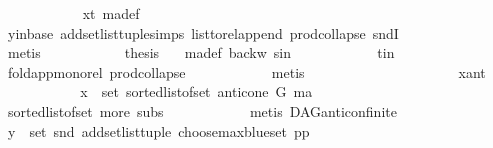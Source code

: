 \begin{isabellebody}
\ \ \ \ \ \ \ \ \ \ \isamarkupfalse%
\ x{\isacharunderscore}{\kern0pt}t\ ma{\isacharunderscore}{\kern0pt}def\ \isanewline
\ \ \ \ \ \ \ \ \ \ \isamarkupfalse%
\ y{\isacharunderscore}{\kern0pt}in{\isacharunderscore}{\kern0pt}base\ add{\isacharunderscore}{\kern0pt}set{\isacharunderscore}{\kern0pt}list{\isacharunderscore}{\kern0pt}tuple{\isachardot}{\kern0pt}simps\ list{\isacharunderscore}{\kern0pt}to{\isacharunderscore}{\kern0pt}rel{\isacharunderscore}{\kern0pt}append\ prod{\isachardot}{\kern0pt}collapse\ sndI\isanewline
\ \ \ \ \ \ \ \ \ \ \isamarkupfalse%
\ metis\isanewline
\ \ \ \ \ \ \ \ \isamarkupfalse%
\ \isamarkupfalse%
\ {\isacharquery}{\kern0pt}thesis\ \isamarkupfalse%
\ \ ma{\isacharunderscore}{\kern0pt}def\ backw\ s{\isacharunderscore}{\kern0pt}in\isanewline
\ \ \ \ \ \ \ \ \ \ \isamarkupfalse%
\ t{\isacharunderscore}{\kern0pt}in\ \isanewline
\ \ \ \ \ \ \ \ \ \ \isamarkupfalse%
\ fold{\isacharunderscore}{\kern0pt}app{\isacharunderscore}{\kern0pt}mono{\isacharunderscore}{\kern0pt}rel\ prod{\isachardot}{\kern0pt}collapse\isanewline
\ \ \ \ \ \ \ \ \ \ \isamarkupfalse%
\ metis\ \ \ \ \ \isanewline
\ \ \ \ \ \ \isamarkupfalse%
\isanewline
\ \ \ \ \ \ \ \ \isamarkupfalse%
\ x{\isacharunderscore}{\kern0pt}ant\isanewline
\ \ \ \ \ \ \ \ \isamarkupfalse%
\ \isamarkupfalse%
\ {\isachardoublequoteopen}x\ {\isasymin}\ set\ {\isacharparenleft}{\kern0pt}sorted{\isacharunderscore}{\kern0pt}list{\isacharunderscore}{\kern0pt}of{\isacharunderscore}{\kern0pt}set\ {\isacharparenleft}{\kern0pt}anticone\ G\ ma{\isacharparenright}{\kern0pt}{\isacharparenright}{\kern0pt}{\isachardoublequoteclose}\ \isanewline
\ \ \ \ \ \ \ \ \ \ \isamarkupfalse%
\ sorted{\isacharunderscore}{\kern0pt}list{\isacharunderscore}{\kern0pt}of{\isacharunderscore}{\kern0pt}set{\isacharparenleft}{\kern0pt}{}{\isacharparenright}{\kern0pt}\ more\ subs{\isacharparenleft}{\kern0pt}{}{\isacharparenright}{\kern0pt}\isanewline
\ \ \ \ \ \ \ \ \ \ \isamarkupfalse%
\ {\isacharparenleft}{\kern0pt}metis\ DAG{\isachardot}{\kern0pt}anticon{\isacharunderscore}{\kern0pt}finite{\isacharparenright}{\kern0pt}\ \isanewline
\ \ \ \ \ \ \ \ \isamarkupfalse%
\ \isamarkupfalse%
\ {\isachardoublequoteopen}y\ {\isasymin}\ set\ {\isacharparenleft}{\kern0pt}snd\ {\isacharparenleft}{\kern0pt}add{\isacharunderscore}{\kern0pt}set{\isacharunderscore}{\kern0pt}list{\isacharunderscore}{\kern0pt}tuple\ {\isacharparenleft}{\kern0pt}choose{\isacharunderscore}{\kern0pt}max{\isacharunderscore}{\kern0pt}blue{\isacharunderscore}{\kern0pt}set\ pp{\isacharparenright}{\kern0pt}{\isacharparenright}{\kern0pt}{\isacharparenright}{\kern0pt}{\isachardoublequoteclose}\isanewline

\end{isabellebody}
